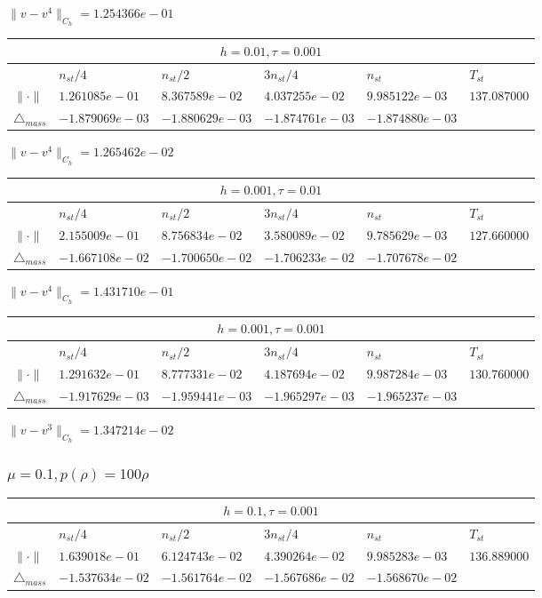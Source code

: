 $\|v-v^{4}\|_{C_h} = 1.254366e-01$

\begin{tabular}{*{6}{|l}|}
    \hline
     \\
    \hline
    &$n_{st}/4 $&$ n_{st}/2$&$3n_{st}/4$&$n_{st}$&$T_{st}$ \\
    \hline
$\|\cdot \|$& $1.261085e-01$ & $8.367589e-02$ & $4.037255e-02$ & $9.985122e-03$ &$137.087000$\\
\hline
$\triangle_{mass}$& $-1.879069e-03$ & $-1.880629e-03$ & $-1.874761e-03$ & $-1.874880e-03$ &\\
\hline
\end{tabular}

$\|v-v^{4}\|_{C_h} = 1.265462e-02$

\begin{tabular}{*{6}{|l}|}
    \hline
     \\
    \hline
    &$n_{st}/4 $&$ n_{st}/2$&$3n_{st}/4$&$n_{st}$&$T_{st}$ \\
    \hline
    $\|\cdot \|$& $2.155009e-01$ & $8.756834e-02$ & $3.580089e-02$ & $9.785629e-03$ &$127.660000$\\
\hline
$\triangle_{mass}$& $-1.667108e-02$ & $-1.700650e-02$ & $-1.706233e-02$ & $-1.707678e-02$ &\\
\hline
\end{tabular}

$\|v-v^{4}\|_{C_h} = 1.431710e-01$

\begin{tabular}{*{6}{|l}|}
    \hline
     \\
    \hline
    &$n_{st}/4 $&$ n_{st}/2$&$3n_{st}/4$&$n_{st}$&$T_{st}$ \\
    \hline
$\|\cdot \|$& $1.291632e-01$ & $8.777331e-02$ & $4.187694e-02$ & $9.987284e-03$ &$130.760000$\\
\hline
$\triangle_{mass}$& $-1.917629e-03$ & $-1.959441e-03$ & $-1.965297e-03$ & $-1.965237e-03$ &\\
\hline
\end{tabular}

$\|v-v^{3}\|_{C_h} = 1.347214e-02$

\subsubsection{$\mu = 0.1, p(\rho) = 100\rho $}

\begin{tabular}{*{6}{|l}|}
    \hline
     \\
    \hline
    &$n_{st}/4 $&$ n_{st}/2$&$3n_{st}/4$&$n_{st}$&$T_{st}$ \\
    \hline
$\|\cdot \|$& $1.639018e-01$ & $6.124743e-02$ & $4.390264e-02$ & $9.985283e-03$ &$136.889000$\\
\hline
$\triangle_{mass}$& $-1.537634e-02$ & $-1.561764e-02$ & $-1.567686e-02$ & $-1.568670e-02$ &\\
\hline    
\end{tabular}


